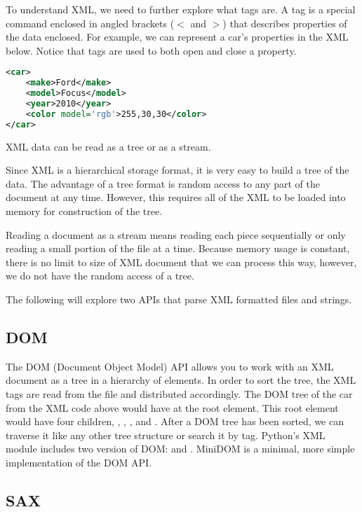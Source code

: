 To understand XML, we need to further explore what tags are.
A tag is a special command enclosed in angled brackets ($<$ and $>$) that describes properties of the data enclosed.
For example, we can represent a car's properties in the XML below. Notice that tags are used to both open and close a property.
\begin{lstlisting}[language=XML]
<car>
    <make>Ford</make>
    <model>Focus</model>
    <year>2010</year>
    <color model='rgb'>255,30,30</color>
</car>
\end{lstlisting}
XML data can be read as a tree or as a stream.

Since XML is a hierarchical storage format, it is very easy to build a tree of the data.
The advantage of a tree format is random access to any part of the document at any time.
However, this requires all of the XML to be loaded into memory for construction of the tree.

Reading a document as a stream means reading each piece sequentially or only reading a small portion of the file at a time.
Because memory usage is constant, there is no limit to size of XML document that we can process this way, however, we do not have the random access of a tree.

The following will explore two APIs that parse XML formatted files and strings.

\subsection*{DOM} %

The DOM (Document Object Model) API allows you to work with an XML document as a tree in a hierarchy of elements.
In order to sort the tree, the XML tags are read from the file and distributed accordingly.
The DOM tree of the car from the XML code above would have  at the root element.
This root element would have four children, , , , and .
After a DOM tree has been sorted, we can traverse it like any other tree structure or search it by tag.
Python's XML module includes two version of DOM:  and .
MiniDOM is a minimal, more simple implementation of the DOM API.

\subsection*{SAX} %

